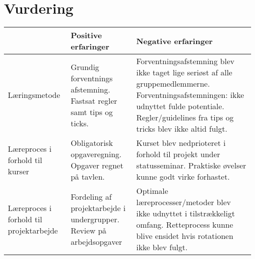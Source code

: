 \section{Vurdering}

\begin{table}[h]
	\begin{tabular}{|p{3cm}|p{5cm}|p{5cm}|}
		\hline
		&\textbf{Positive erfaringer}&\textbf{Negative erfaringer}\\ \hline
	Læringsmetode	& Grundig forventnings afstemning. \newline \newline Fastsat regler samt tips og ticks.& Forventningsafstemning blev ikke taget lige seriøst af alle gruppemedlemmerne. \newline \newline Forventningsafstemningen: ikke udnyttet fulde potentiale.\newline \newline
	 Regler/guidelines fra tips og tricks blev ikke altid fulgt. \\ \hline
	Læreproces i forhold til kurser & Obligatorisk opgaveregning. \newline \newline Opgaver regnet på tavlen. & Kurset blev nedprioteret i forhold til projekt under statusseminar. \newline \newline Praktiske øvelser kunne godt virke forhastet. \\ \hline
	Læreproces i forhold til projektarbejde & Fordeling af projektarbejde i undergrupper. \newline \newline Review på arbejdsopgaver & Optimale læreprocesser/metoder blev ikke udnyttet i tilstrækkeligt omfang. \newline \newline Retteprocess kunne blive ensidet hvis rotationen ikke blev fulgt. \\ \hline
		
	\end{tabular}
\end{table}


